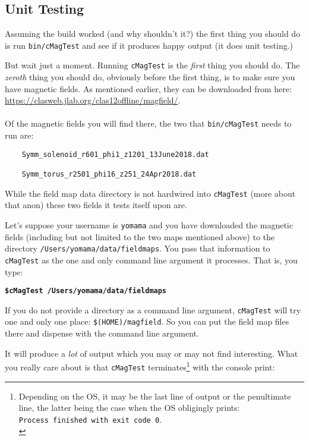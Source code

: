 \documentclass{article}
\begin{document}
\subsection {Unit Testing}
Assuming the build worked (and why shouldn't it?) the first thing you should do is run \texttt{bin/cMagTest} and see if it produces happy output (it does unit testing.) 

But wait just a moment. Running  \texttt{cMagTest} is the \textit{first} thing you should do. The \textit{zeroth} thing you should do, obviously before the first thing, is to make sure you have magnetic fields.  As mentioned earlier, they can be downloaded from here:\\

 \url{https://clasweb.jlab.org/clas12offline/magfield/}.\\
\vspace{1mm}\\
Of the magnetic fields you will find there, the two that \texttt{bin/cMagTest}  needs to run are:\\

\begin{verbatim}
    Symm_solenoid_r601_phi1_z1201_13June2018.dat

    Symm_torus_r2501_phi16_z251_24Apr2018.dat
\end{verbatim} 
\vspace{1.5mm}

While the field map data directory is not hardwired into \texttt{cMagTest} (more about that anon) these two fields it tests itself upon are. 

Let's suppose your username is \texttt{yomama} and you have downloaded the magnetic fields (including but not limited to the two maps mentioned above) to the directory \texttt{/Users/yomama/data/fieldmaps}. You pass that information to \texttt{cMagTest} as the one and only command line argument it processes. That is, you type:

\textbf{\texttt{\$cMagTest /Users/yomama/data/fieldmaps}}

If you do not provide a directory as a command line argument, \texttt{cMagTest} will try one and only one place: \texttt{\$(HOME)/magfield}. So you can put the field map files there and dispense with the command line argument.

It will produce a \textit{lot} of output which you may or may not find interesting.  What you really care about is that \texttt{cMagTest} terminates\footnote{Depending on the OS, it may be the last line of output or the penultimate line, the latter being the case when the OS obligingly prints:\\ \texttt{Process finished with exit code 0}.\\} with the console print: 
\end{document}
